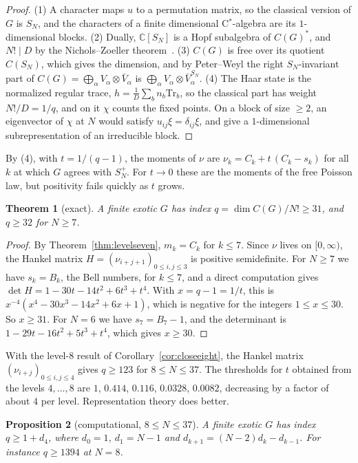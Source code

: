 \documentclass[11pt]{amsart}
\newtheorem{theorem}{Theorem}[section]
\newtheorem{proposition}[theorem]{Proposition}
\theoremstyle{definition}
\theoremstyle{remark}
\theoremstyle{plain}
\numberwithin{equation}{section}
\numberwithin{table}{section}
\newcommand{\C}{\mathbb C}
\begin{document}
\begin{proof}
(1) A character maps $u$ to a permutation matrix, so the classical version of $G$ is $S_N$, and the characters of a finite dimensional C$^*$-algebra are its $1$-dimensional blocks. (2) Dually, $\C[S_N]$ is a Hopf subalgebra of $C(G)^*$, and $N!\mid D$ by the Nichols--Zoeller theorem~\cite{nz}. (3) $C(G)$ is free over its quotient $C(S_N)$, which gives the dimension, and by Peter--Weyl the right $S_N$-invariant part of $C(G)=\bigoplus_\alpha V_\alpha\otimes\bar V_\alpha$ is $\bigoplus_\alpha V_\alpha\otimes\bar V_\alpha^{S_N}$. (4) The Haar state is the normalized regular trace, $h=\frac1D\sum_bn_b\mathrm{Tr}_b$, so the classical part has weight $N!/D=1/q$, and on it $\chi$ counts the fixed points. On a block of size $\ge2$, an eigenvector of $\chi$ at $N$ would satisfy $u_{ij}\xi=\delta_{ij}\xi$, and give a $1$-dimensional subrepresentation of an irreducible block.
\end{proof}

By (4), with $t=1/(q-1)$, the moments of $\nu$ are $\nu_k=C_k+t\,(C_k-s_k)$ for all $k$ at which $G$ agrees with $S_N^+$. For $t\to0$ these are the moments of the free Poisson law, but positivity fails quickly as $t$ grows.

\begin{theorem}[exact]\label{thm:finiteindex}
A finite exotic $G$ has index $q=\dim C(G)/N!\ge31$, and $q\ge32$ for $N\ge7$.
\end{theorem}

\begin{proof}
By Theorem~\ref{thm:levelseven}, $m_k=C_k$ for $k\le7$. Since $\nu$ lives on $[0,\infty)$, the Hankel matrix $H=(\nu_{i+j+1})_{0\le i,j\le3}$ is positive semidefinite. For $N\ge7$ we have $s_k=B_k$, the Bell numbers, for $k\le7$, and a direct computation gives $\det H=1-30t-14t^2+6t^3+t^4$. With $x=q-1=1/t$, this is $x^{-4}(x^4-30x^3-14x^2+6x+1)$, which is negative for the integers $1\le x\le30$. So $x\ge31$. For $N=6$ we have $s_7=B_7-1$, and the determinant is $1-29t-16t^2+5t^3+t^4$, which gives $x\ge30$.
\end{proof}

With the level-$8$ result of Corollary~\ref{cor:closeeight}, the Hankel matrix $(\nu_{i+j})_{0\le i,j\le4}$ gives $q\ge123$ for $8\le N\le37$. The thresholds for $t$ obtained from the levels $4,\dots,8$ are $1$, $0.414$, $0.116$, $0.0328$, $0.0082$, decreasing by a factor of about $4$ per level. Representation theory does better.

\begin{proposition}[computational, $8\le N\le37$]\label{prop:finfrob}
A finite exotic $G$ has index $q\ge1+d_4$, where $d_0=1$, $d_1=N-1$ and $d_{k+1}=(N-2)d_k-d_{k-1}$. For instance $q\ge1394$ at $N=8$.
\end{proposition}
\end{document}
